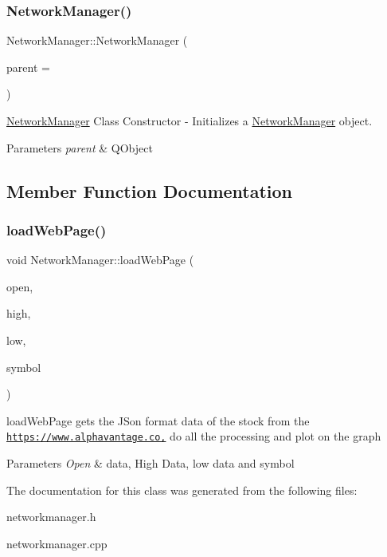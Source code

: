 \subsubsection{\texorpdfstring{Network\+Manager()}{NetworkManager()}}
{\footnotesize\ttfamily Network\+Manager\+::\+Network\+Manager (\begin{DoxyParamCaption}\item[{Q\+Object $\ast$}]{parent = {} }\end{DoxyParamCaption})\hspace{0.3cm}{\ttfamily [explicit]}}



\hyperlink{class_network_manager}{Network\+Manager} Class Constructor -\/ Initializes a \hyperlink{class_network_manager}{Network\+Manager} object. 


\begin{DoxyParams}{Parameters}
{\em parent} & Q\+Object \\
\hline
\end{DoxyParams}


\subsection{Member Function Documentation}
\mbox{\label{class_network_manager_ac18e89037f60537fb2c32040a9720e07}} 
\subsubsection{\texorpdfstring{load\+Web\+Page()}{loadWebPage()}}
{\footnotesize\ttfamily void Network\+Manager\+::load\+Web\+Page (\begin{DoxyParamCaption}\item[{Q\+Line\+Series $\ast$}]{open,  }\item[{Q\+Line\+Series $\ast$}]{high,  }\item[{Q\+Line\+Series $\ast$}]{low,  }\item[{Q\+String}]{symbol }\end{DoxyParamCaption})}



load\+Web\+Page gets the J\+Son format data of the stock from the \href{https://www.alphavantage.co,}{\tt https\+://www.\+alphavantage.\+co,} do all the processing and plot on the graph 


\begin{DoxyParams}{Parameters}
{\em Open} & data, High Data, low data and symbol \\
\hline
\end{DoxyParams}


The documentation for this class was generated from the following files\+:\begin{DoxyCompactItemize}
\item 
networkmanager.\+h\item 
networkmanager.\+cpp\end{DoxyCompactItemize}
